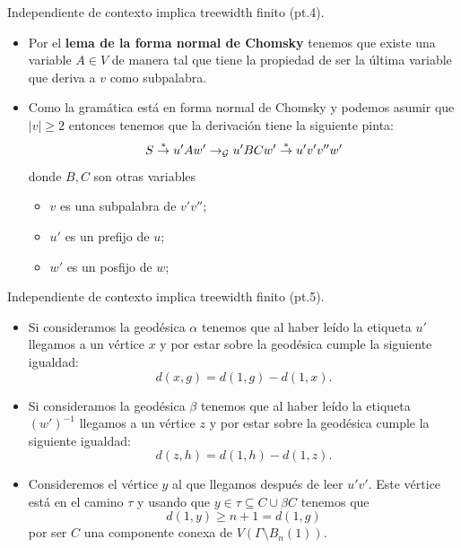 \documentclass[aspectratio=169, 11pt]{beamer}
\begin{document}
	\begin{frame}[fragile]{Independiente de contexto implica treewidth finito (pt.4).}
		\begin{itemize}
			\item 
				Por el \textbf{lema de la forma normal de Chomsky} tenemos que existe una variable $A \in V$ de manera tal que tiene la propiedad de ser la última variable que deriva a $v$ como subpalabra.

			\item 
				Como la gramática está en forma normal de Chomsky y podemos asumir que $|v| \ge 2$ entonces tenemos que la derivación tiene la siguiente pinta:
				\begin{equation*}
					S \overset{*}{\to} u'Aw' \to_{\cal G} u'BC w' \overset{*}{\to} u'v'v''w'
				\end{equation*}
				donde $B,C$ son otras variables 
				\begin{itemize}
					\item $v$ es una subpalabra de $v'v''$;
					\item $u'$ es un prefijo de $u$;
					\item $w'$ es un posfijo de $w$;
				\end{itemize}
		\end{itemize}
	\end{frame}

	\begin{frame}[fragile]{Independiente de contexto implica treewidth finito (pt.5).}
		\begin{itemize}
			\item 
				Si consideramos la geodésica $\alpha$ tenemos que al haber leído la etiqueta $u'$ llegamos a un vértice $x$ y por estar sobre la geodésica cumple la siguiente igualdad:
				\begin{equation*}
					d(x,g) = d(1,g) - d(1,x).
				\end{equation*}
			
			\item 
				Si consideramos la geodésica $\beta$ tenemos que al haber leído la etiqueta $(w')^{-1}$ llegamos a un vértice $z$ y por estar sobre la geodésica cumple la siguiente igualdad:
				\begin{equation*}
					d(z,h)  = d(1,h) - d(1,z).
				\end{equation*}

			\item 
				Consideremos el vértice $y$ al que llegamos después de leer $u'v'$.
				Este vértice está en el camino $\tau$ y usando que $y \in \tau \subseteq C \cup \beta C $ tenemos que
					\[
						d(1,y) \ge n+1 = d(1,g)	
					\]
				por ser $C$ una componente conexa de $V(\Gamma \setminus B_{n}(1))$.
			
		\end{itemize}
	\end{frame}
\end{document}
